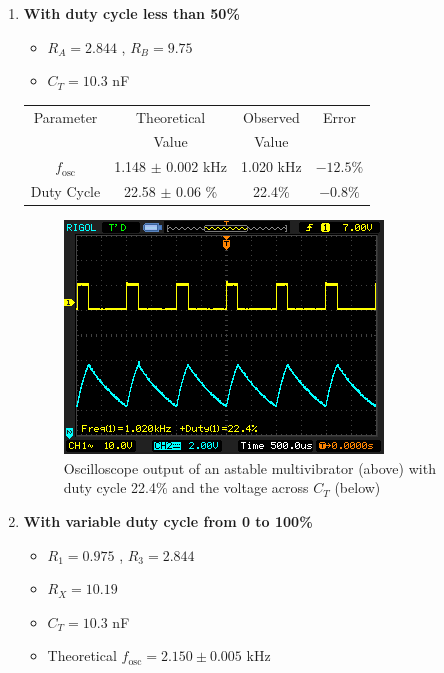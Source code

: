\begin{enumerate}
\begin{enumerate}
    \item \textbf{With duty cycle less than 50\%}
        \begin{itemize}
            \item $R_A=2.844$ \kohm, $R_B=9.75$ \kohm
            \item $C_T=10.3$ nF
        \end{itemize}

        \begin{table}[H]
            \centering
            \begin{tabular}{|c|c|c|c|}\hline
                Parameter & Theoretical & Observed & Error \\ 
                        & Value       & Value    &       \\ \hline 
                $f_\text{osc}$   & 1.148 $\pm$ 0.002 kHz & 1.020 kHz & $-12.5\%$  \\ \hline
                Duty Cycle       & 22.58 $\pm$ 0.06 \% & 22.4\%  & $-0.8\%$ \\ \hline
            \end{tabular}
        \end{table}

        \begin{figure}[H]
            \centering
            \includegraphics[width=0.80\columnwidth]{images/astable2.png}
            \caption{Oscilloscope output of an astable multivibrator (above) with duty cycle 22.4\% and the voltage across $C_T$ (below)}
        \end{figure}

    \item \textbf{With variable duty cycle from 0 to 100\%}
        \begin{itemize}
            \item $R_1=0.975$ \kohm, $R_3=2.844$ \kohm
            \item $R_X=10.19$ \kohm
            \item $C_T=10.3$ nF
            \item Theoretical $f_\text{osc}=2.150 \pm 0.005$ kHz
        \end{itemize}


\end{enumerate}
\end{enumerate}
